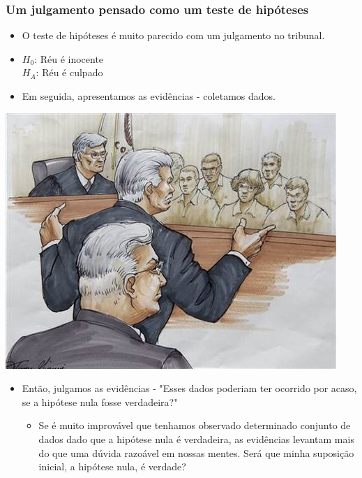 \begin{frame}
\frametitle{Um julgamento pensado como um teste de hipóteses}

{
\begin{itemize}
\justifying
\item O teste de hipóteses é muito parecido com um julgamento no tribunal.
\justifying
\item $H_0$: Réu é inocente \\
$H_A$: Réu é culpado
\justifying
\item Em seguida, apresentamos as evidências - coletamos dados.

\end{itemize}
}
{
\includegraphics[width=\textwidth]{1-8_gender_discrimination/trial.png}
}

\begin{itemize}
\justifying
\item Então, julgamos as evidências - "Esses dados poderiam ter ocorrido por acaso, se a hipótese nula fosse verdadeira?"
\begin{itemize}
\justifying
\item Se é muito improvável que tenhamos observado determinado conjunto de dados dado que a hipótese nula é verdadeira, as evidências levantam mais do que uma dúvida razoável em nossas mentes. \pause Será que minha suposição inicial, a hipótese nula, é verdade? 
\end{itemize}
\end{itemize}
\end{frame}

